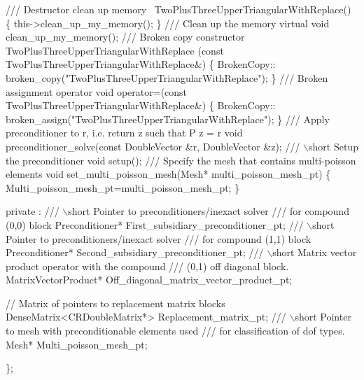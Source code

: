 \begin{DoxyCodeInclude}
  \textcolor{comment}{}
\textcolor{comment}{  /// Destructor clean up memory}
\textcolor{comment}{}  ~TwoPlusThreeUpperTriangularWithReplace()
   \{
    this->clean\_up\_my\_memory();
   \}
\textcolor{comment}{}
\textcolor{comment}{  /// Clean up the memory}
\textcolor{comment}{}  \textcolor{keyword}{virtual} \textcolor{keywordtype}{void} clean\_up\_my\_memory();
\textcolor{comment}{}
\textcolor{comment}{  /// Broken copy constructor}
\textcolor{comment}{}  TwoPlusThreeUpperTriangularWithReplace
  (\textcolor{keyword}{const} TwoPlusThreeUpperTriangularWithReplace&) 
   \{ 
    BrokenCopy::
     broken\_copy(\textcolor{stringliteral}{"TwoPlusThreeUpperTriangularWithReplace"});
   \} 
  \textcolor{comment}{}
\textcolor{comment}{  /// Broken assignment operator}
\textcolor{comment}{}  \textcolor{keywordtype}{void} operator=(\textcolor{keyword}{const} TwoPlusThreeUpperTriangularWithReplace&) 
   \{
    BrokenCopy::
     broken\_assign(\textcolor{stringliteral}{"TwoPlusThreeUpperTriangularWithReplace"});
   \}
  \textcolor{comment}{}
\textcolor{comment}{  /// Apply preconditioner to r, i.e. return z such that P z = r}
\textcolor{comment}{}  \textcolor{keywordtype}{void} preconditioner\_solve(\textcolor{keyword}{const} DoubleVector &r, DoubleVector &z);
  \textcolor{comment}{}
\textcolor{comment}{  /// \(\backslash\)short Setup the preconditioner }
\textcolor{comment}{}  \textcolor{keywordtype}{void} setup();
 \textcolor{comment}{}
\textcolor{comment}{  /// Specify the mesh that contains multi-poisson elements}
\textcolor{comment}{}  \textcolor{keywordtype}{void} set\_multi\_poisson\_mesh(Mesh* multi\_poisson\_mesh\_pt)
  \{
   Multi\_poisson\_mesh\_pt=multi\_poisson\_mesh\_pt;
  \}

   private :
  \textcolor{comment}{}
\textcolor{comment}{  /// \(\backslash\)short Pointer to preconditioners/inexact solver}
\textcolor{comment}{  /// for compound  (0,0) block}
\textcolor{comment}{}  Preconditioner* First\_subsidiary\_preconditioner\_pt;
  \textcolor{comment}{}
\textcolor{comment}{  /// \(\backslash\)short Pointer to preconditioners/inexact solver}
\textcolor{comment}{  /// for compound (1,1) block}
\textcolor{comment}{}  Preconditioner* Second\_subsidiary\_preconditioner\_pt;
\textcolor{comment}{}
\textcolor{comment}{  /// \(\backslash\)short Matrix vector product operator with the compound }
\textcolor{comment}{  /// (0,1) off diagonal block.}
\textcolor{comment}{}  MatrixVectorProduct* Off\_diagonal\_matrix\_vector\_product\_pt;

  \textcolor{comment}{// Matrix of pointers to replacement matrix blocks}
  DenseMatrix<CRDoubleMatrix*> Replacement\_matrix\_pt;
\textcolor{comment}{}
\textcolor{comment}{  /// \(\backslash\)short Pointer to mesh with preconditionable elements used}
\textcolor{comment}{  /// for classification of dof types.}
\textcolor{comment}{}  Mesh* Multi\_poisson\_mesh\_pt;
  
 \};

\end{DoxyCodeInclude}
